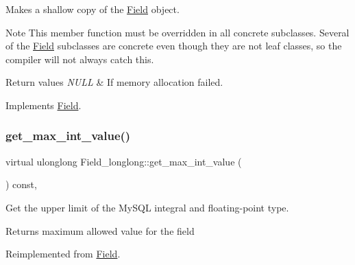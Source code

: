 Makes a shallow copy of the \mbox{\hyperlink{classField}{Field}} object.

\begin{DoxyNote}{Note}
This member function must be overridden in all concrete subclasses. Several of the \mbox{\hyperlink{classField}{Field}} subclasses are concrete even though they are not leaf classes, so the compiler will not always catch this.
\end{DoxyNote}

\begin{DoxyRetVals}{Return values}
{\em N\+U\+LL} & If memory allocation failed. \\
\hline
\end{DoxyRetVals}


Implements \mbox{\hyperlink{classField_a01a9a9aa3a618941e839b1b8793c969d}{Field}}.

\mbox{\label{classField__longlong_a6d530e3dbf852f37e768c8875783cc8c}} 
\subsubsection{\texorpdfstring{get\+\_\+max\+\_\+int\+\_\+value()}{get\_max\_int\_value()}}
{\footnotesize\ttfamily virtual ulonglong Field\+\_\+longlong\+::get\+\_\+max\+\_\+int\+\_\+value (\begin{DoxyParamCaption}{ }\end{DoxyParamCaption}) const\hspace{0.3cm}{\ttfamily [inline]}, {\ttfamily [virtual]}}

Get the upper limit of the My\+S\+QL integral and floating-\/point type.

\begin{DoxyReturn}{Returns}
maximum allowed value for the field 
\end{DoxyReturn}


Reimplemented from \mbox{\hyperlink{classField_a22f18fbe3224a5ac4f23a90523b09087}{Field}}.

\mbox{\label{classField__longlong_ac58073f392f57b9c2c7c158880f5578a}} 

